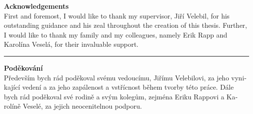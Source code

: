 \clearpage
\vspace*{\fill}
\noindent\textbf{Acknowledgements}\\[0.25cm]
First and foremost, I would like to thank my supervisor, Jiří Velebil, for his outstanding guidance and his zeal throughout the creation of this thesis. Further, I would like to thank my family and my colleagues, namely Erik Rapp and Karolína Veselá, for their invaluable support.\\
\hrule\vspace*{1cm}

\noindent\textbf{Poděkování}\\[0.25cm]
\foreignlanguage{czech}{Především bych rád poděkoval svému vedoucímu, Jiřímu Velebilovi, za jeho vynikající vedení a za jeho zapálenost a vstřícnost během tvorby této práce. Dále bych rád poděkoval své rodině a svým kolegům, zejména Eriku Rappovi a Karolíně Veselé, za jejich neocenitelnou podporu.}
\clearpage